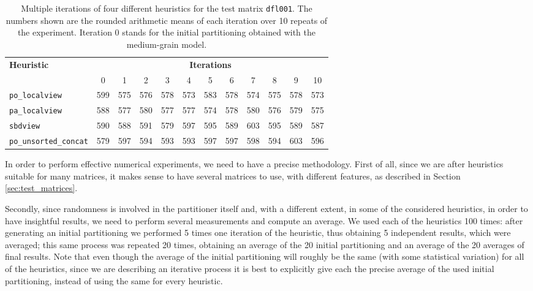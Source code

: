 \begin{table}[h]
	\centering
	\begin{tabular}{|l|c||c|c|c|c|c|c|c|c|c|c|}
		\hline
		\multirow{2}{*}{\textbf{Heuristic}} & \multicolumn{11}{c|}{\textbf{Iterations}} \\ \cline{2-12} 
		& 0 & 1 & 2 & 3 & 4 & 5 & 6 & 7 & 8 & 9 & 10 \\ \hline
		\verb|po_localview| & 599 & 575 & 576 & 578 & 573 & 583 & 578 & 574 & 575 & 578 & 573 \\
		\verb|pa_localview| & 588 & 577 & 580 & 577 & 577 & 574 & 578 & 580 & 576 & 579 & 575  \\
		\verb|sbdview| & 590 & 588 & 591 & 579 & 597 & 595 & 589 & 603 & 595 & 589 & 587 \\
		\verb|po_unsorted_concat| & 579 & 597 & 594 & 593 & 593 & 597 & 597 & 598 & 594 & 603 & 596 \\ 
		\hline
	\end{tabular}
	\caption{Multiple iterations of four different heuristics for the test matrix \texttt{dfl001}. The numbers shown are the rounded arithmetic means of each iteration over 10 repeats of the experiment. Iteration 0 stands for the initial partitioning obtained with the medium-grain model. } \label{tab:iterations}
\end{table}

In order to perform effective numerical experiments, we need to have a precise methodology. First of all, since we are after heuristics suitable for many matrices, it makes sense to have several matrices to use, with different features, as described in Section \ref{sec:test_matrices}. 

Secondly, since randomness is involved in the partitioner itself and, with a different extent, in some of the considered heuristics, in order to have insightful results, we need to perform several measurements and compute an average. We used each of the heuristics 100 times: after generating an initial partitioning we performed 5 times one iteration of the heuristic, thus obtaining 5 independent results, which were averaged; this same process was repeated 20 times, obtaining an average of the 20 initial partitioning and an average of the 20 averages of final results. Note that even though the average of the initial partitioning will roughly be the same (with some statistical variation) for all of the heuristics, since we are describing an iterative process it is best to explicitly give each the precise average of the used initial partitioning, instead of using the same for every heuristic.

